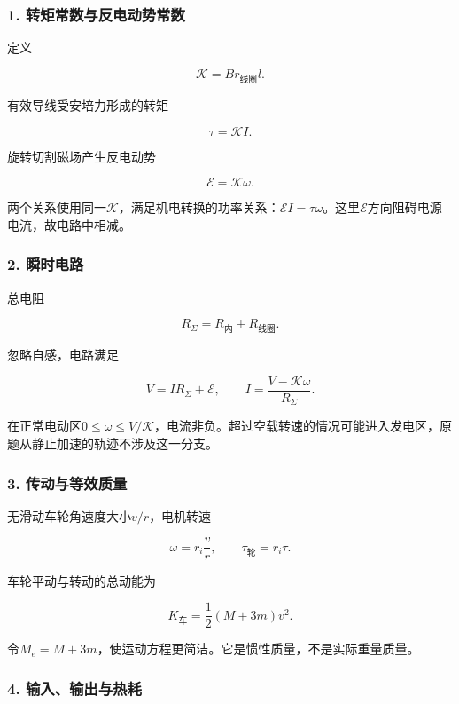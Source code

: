 \documentclass[12pt,a4paper,fontset=fandol]{ctexart}
\begin{document}
\subsubsection{1.
转矩常数与反电动势常数}\label{ux8f6cux77e9ux5e38ux6570ux4e0eux53cdux7535ux52a8ux52bfux5e38ux6570}

定义

\[
\mathcal K=B r_{\text{线圈}}l.
\]

有效导线受安培力形成的转矩

\[
\tau=\mathcal K I.
\]

旋转切割磁场产生反电动势

\[
\mathcal E=\mathcal K\omega.
\]

两个关系使用同一\(\mathcal K\)，满足机电转换的功率关系：\(\mathcal EI=\tau\omega\)。这里\(\mathcal E\)方向阻碍电源电流，故电路中相减。

\subsubsection{2. 瞬时电路}\label{ux77acux65f6ux7535ux8def}

总电阻

\[
R_\Sigma=R_{\text{内}}+R_{\text{线圈}}.
\]

忽略自感，电路满足

\[
V=IR_\Sigma+\mathcal E,
\qquad I=\frac{V-\mathcal K\omega}{R_\Sigma}.
\]

在正常电动区\(0\leq\omega\leq V/\mathcal K\)，电流非负。超过空载转速的情况可能进入发电区，原题从静止加速的轨迹不涉及这一分支。

\subsubsection{3.
传动与等效质量}\label{ux4f20ux52a8ux4e0eux7b49ux6548ux8d28ux91cf}

无滑动车轮角速度大小\(v/r\)，电机转速

\[
\omega=r_i\frac vr,\qquad
\tau_{\text{轮}}=r_i\tau.
\]

车轮平动与转动的总动能为

\[
K_{\text{车}}=\frac12(M+3m)v^2.
\]

令\(M_e=M+3m\)，使运动方程更简洁。它是惯性质量，不是实际重量质量。

\subsubsection{4.
输入、输出与热耗}\label{ux8f93ux5165ux8f93ux51faux4e0eux70edux8017}
\end{document}
